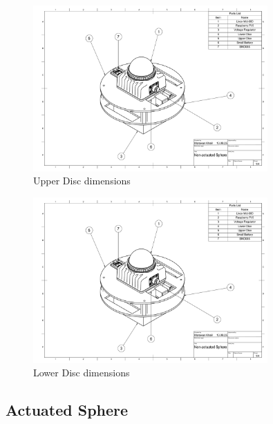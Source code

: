 \documentclass[english, bachelor, utf8]{base/thesis_telematics}
\begin{document}
\begin{figure}[H]
\centering
\includegraphics[width=0.80\textwidth,page=3]{pics/Non_actuated_Sphere_drawing.pdf}
\caption{Upper Disc dimensions}
\label{fig:system_page3}
\end{figure}

\begin{figure}[H]
\centering
\includegraphics[width=0.80\textwidth,page=4]{pics/Non_actuated_Sphere_drawing.pdf}
\caption{Lower Disc dimensions}
\label{fig:system_page4}
\end{figure}

\clearpage %

\subsection{Actuated Sphere}
\label{sec:actuated-sphere-drawings}
\clearpage %
\end{document}

